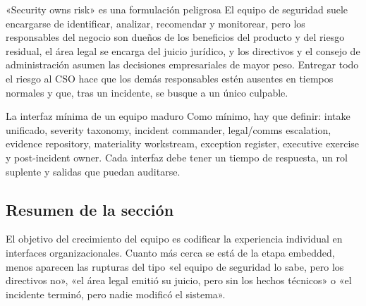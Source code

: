 \begin{warningbox}{«Security owns risk» es una formulación peligrosa}
El equipo de seguridad suele encargarse de identificar, analizar, recomendar y monitorear, pero los responsables del negocio son dueños de los beneficios del producto y del riesgo residual, el área legal se encarga del juicio jurídico, y los directivos y el consejo de administración asumen las decisiones empresariales de mayor peso. Entregar todo el riesgo al CSO hace que los demás responsables estén ausentes en tiempos normales y que, tras un incidente, se busque a un único culpable.
\end{warningbox}

\begin{importantbox}{La interfaz mínima de un equipo maduro}
Como mínimo, hay que definir: intake unificado, severity taxonomy, incident commander, legal/comms escalation, evidence repository, materiality workstream, exception register, executive exercise y post-incident owner. Cada interfaz debe tener un tiempo de respuesta, un rol suplente y salidas que puedan auditarse.
\end{importantbox}

\subsection{Resumen de la sección}

El objetivo del crecimiento del equipo es codificar la experiencia individual en interfaces organizacionales. Cuanto más cerca se está de la etapa embedded, menos aparecen las rupturas del tipo «el equipo de seguridad lo sabe, pero los directivos no», «el área legal emitió su juicio, pero sin los hechos técnicos» o «el incidente terminó, pero nadie modificó el sistema».
